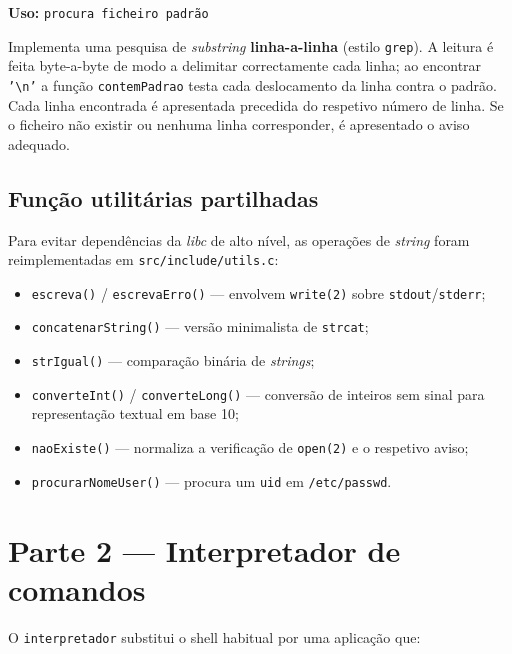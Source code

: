 \documentclass[11pt,a4paper]{article}
\begin{document}
\textbf{Uso:} \texttt{procura ficheiro padrão}

Implementa uma pesquisa de \textit{substring} \textbf{linha-a-linha} (estilo \texttt{grep}). A leitura é feita byte-a-byte de modo a delimitar correctamente cada linha; ao encontrar \texttt{'\textbackslash n'} a função \texttt{contemPadrao} testa cada deslocamento da linha contra o padrão. Cada linha encontrada é apresentada precedida do respetivo número de linha. Se o ficheiro não existir ou nenhuma linha corresponder, é apresentado o aviso adequado.

\subsection{Função utilitárias partilhadas}

Para evitar dependências da \textit{libc} de alto nível, as operações de \textit{string} foram reimplementadas em \texttt{src/include/utils.c}:

\begin{itemize}[leftmargin=1.5em]
    \item \texttt{escreva()} / \texttt{escrevaErro()} --- envolvem \texttt{write(2)} sobre \texttt{stdout}/\texttt{stderr};
    \item \texttt{concatenarString()} --- versão minimalista de \texttt{strcat};
    \item \texttt{strIgual()} --- comparação binária de \textit{strings};
    \item \texttt{converteInt()} / \texttt{converteLong()} --- conversão de inteiros sem sinal para representação textual em base 10;
    \item \texttt{naoExiste()} --- normaliza a verificação de \texttt{open(2)} e o respetivo aviso;
    \item \texttt{procurarNomeUser()} --- procura um \texttt{uid} em \texttt{/etc/passwd}.
\end{itemize}

\section{Parte 2 --- Interpretador de comandos}

O \texttt{interpretador} substitui o shell habitual por uma aplicação que:
\end{document}

